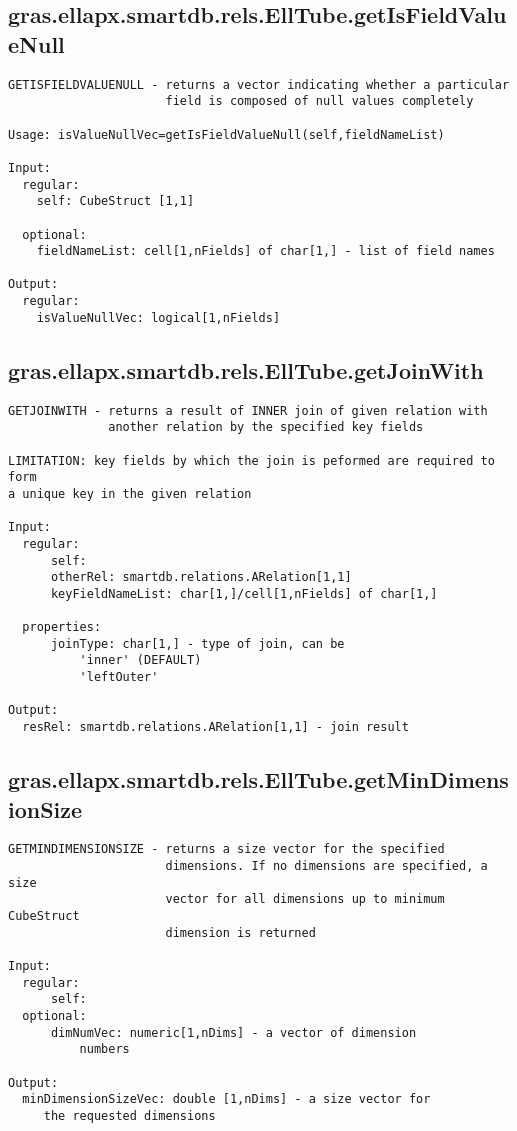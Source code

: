 \subsection{\texorpdfstring{gras.ellapx.smartdb.rels.EllTube.getIsFieldValueNull}{getIsFieldValueNull}}\label{method:gras.ellapx.smartdb.rels.EllTube.getIsFieldValueNull}
\begin{verbatim}
GETISFIELDVALUENULL - returns a vector indicating whether a particular
                      field is composed of null values completely

Usage: isValueNullVec=getIsFieldValueNull(self,fieldNameList)

Input:
  regular:
    self: CubeStruct [1,1]

  optional:
    fieldNameList: cell[1,nFields] of char[1,] - list of field names

Output:
  regular:
    isValueNullVec: logical[1,nFields]
\end{verbatim}
\subsection{\texorpdfstring{gras.ellapx.smartdb.rels.EllTube.getJoinWith}{getJoinWith}}\label{method:gras.ellapx.smartdb.rels.EllTube.getJoinWith}
\begin{verbatim}
GETJOINWITH - returns a result of INNER join of given relation with
              another relation by the specified key fields

LIMITATION: key fields by which the join is peformed are required to form
a unique key in the given relation

Input:
  regular:
      self:
      otherRel: smartdb.relations.ARelation[1,1]
      keyFieldNameList: char[1,]/cell[1,nFields] of char[1,]

  properties:
      joinType: char[1,] - type of join, can be
          'inner' (DEFAULT)
          'leftOuter'

Output:
  resRel: smartdb.relations.ARelation[1,1] - join result
\end{verbatim}
\subsection{\texorpdfstring{gras.ellapx.smartdb.rels.EllTube.getMinDimensionSize}{getMinDimensionSize}}\label{method:gras.ellapx.smartdb.rels.EllTube.getMinDimensionSize}
\begin{verbatim}
GETMINDIMENSIONSIZE - returns a size vector for the specified
                      dimensions. If no dimensions are specified, a size
                      vector for all dimensions up to minimum CubeStruct
                      dimension is returned

Input:
  regular:
      self:
  optional:
      dimNumVec: numeric[1,nDims] - a vector of dimension
          numbers

Output:
  minDimensionSizeVec: double [1,nDims] - a size vector for
     the requested dimensions
\end{verbatim}
